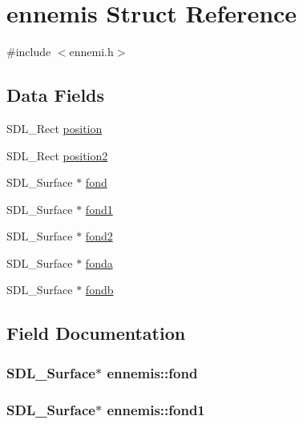 \hypertarget{structennemis}{}\section{ennemis Struct Reference}
\label{structennemis}


{\ttfamily \#include $<$ennemi.\+h$>$}

\subsection*{Data Fields}
\begin{DoxyCompactItemize}
\item 
S\+D\+L\+\_\+\+Rect \hyperlink{structennemis_a3e8a9864c41c217f29e8fa94c3323414}{position}
\item 
S\+D\+L\+\_\+\+Rect \hyperlink{structennemis_a25ac4c539f00f1d72a98164bbbe17f18}{position2}
\item 
S\+D\+L\+\_\+\+Surface $\ast$ \hyperlink{structennemis_a12545f1dec3d4c2f47ea779e08a832bd}{fond}
\item 
S\+D\+L\+\_\+\+Surface $\ast$ \hyperlink{structennemis_ad566435b5e86ee846b20ca8c261a9d9f}{fond1}
\item 
S\+D\+L\+\_\+\+Surface $\ast$ \hyperlink{structennemis_a7cdce135302cefeedce69637c561ca87}{fond2}
\item 
S\+D\+L\+\_\+\+Surface $\ast$ \hyperlink{structennemis_a0656bf1f2a05bd147d373d7eaa3f4285}{fonda}
\item 
S\+D\+L\+\_\+\+Surface $\ast$ \hyperlink{structennemis_aaef083b31ba478455bcbd16ed7235efb}{fondb}
\end{DoxyCompactItemize}


\subsection{Field Documentation}
\subsubsection[{\texorpdfstring{fond}{fond}}]{\setlength{\rightskip}{0pt plus 5cm}S\+D\+L\+\_\+\+Surface$\ast$ ennemis\+::fond}\hypertarget{structennemis_a12545f1dec3d4c2f47ea779e08a832bd}{}\label{structennemis_a12545f1dec3d4c2f47ea779e08a832bd}
\subsubsection[{\texorpdfstring{fond1}{fond1}}]{\setlength{\rightskip}{0pt plus 5cm}S\+D\+L\+\_\+\+Surface$\ast$ ennemis\+::fond1}\hypertarget{structennemis_ad566435b5e86ee846b20ca8c261a9d9f}{}\label{structennemis_ad566435b5e86ee846b20ca8c261a9d9f}
